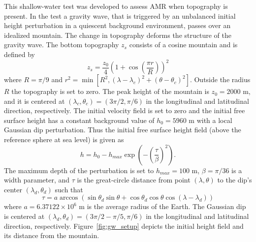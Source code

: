 This shallow-water test was
developed to assess AMR when topography is present.  In the test a
gravity wave, that is triggered by an unbalanced initial height perturbation in a quiescent background environment, passes over an
idealized mountain.  The change in topography deforms the structure of
the gravity wave.  The bottom topography $z_s$ consists of a cosine mountain
and is defined by
\begin{equation}
    \label{eq:topomount} z_s = \frac{z_0}{4}\left(1+\cos\left(\frac{\pi
    r}{R}\right)\right)^2
\end{equation}
where $R=\pi/9$ and 
$r^2 = \min[R^2, (\lambda-\lambda_c)^2+(\theta - \theta_c)^2]$. Outside the radius $R$ 
the topography is set to zero.  
The peak height of the mountain is $z_0=2000\text{ m}$, and it is
centered at $(\lambda_c,\theta_c)=(3\pi/2,\pi/6)$ in the longitudinal and latitudinal direction, respectively. %
The initial velocity field is set to zero and the initial free surface
height has a constant background value of $h_0=5960 \text{ m}$ with a
local Gaussian dip perturbation.  Thus the initial free surface height field (above the reference sphere at sea level) is given
as
\begin{equation}
    \label{eq:gwmountgauss} h = h_0 - h_{max} \exp{\left(-\left(\frac{\tau}
    {\beta}\right)^2\right)}.
\end{equation}
The maximum depth of the perturbation is set to $h_{max}=100\text{ m}$,
$\beta=\pi/36$ is a width parameter, and $\tau$ is the great-circle distance
from point $(\lambda,\theta)$ to the dip's center $(\lambda_d,\theta_d)$
such that
\begin{equation}
    \label{eq:gc} \tau = a \arccos \left(\sin\theta_d \sin\theta + \cos\theta_d
    \cos\theta \cos\left(\lambda - \lambda_d\right)\right)
\end{equation}
where $a = 6.37122 \times 10^{6}\text{ m}$ is the average radius of
the Earth.  The Gaussian dip is centered at 
$(\lambda_d,\theta_d)=(3\pi/2 - \pi/5, \pi/6)$ in the longitudinal and latitudinal direction, respectively.
Figure~\ref{fig:gw_setup} depicts the initial height field and its distance
from the mountain.
%
